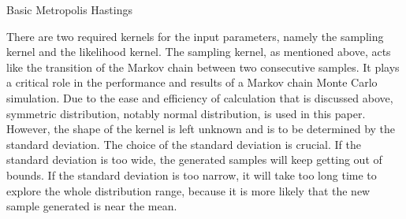 \begin{algorithm}[H]
\BlankLine


\caption[Metropolis Hastings]{Basic Metropolis Hastings}
\end{algorithm}

There are two required kernels for the input parameters, namely the sampling kernel and the likelihood kernel. The sampling kernel, as mentioned above, acts like the transition of the Markov chain between two consecutive samples. It plays a critical role in the performance and results of a Markov chain Monte Carlo simulation.\cite{mcmc_practice} Due to the ease and efficiency of calculation that is discussed above, symmetric distribution, notably normal distribution, is used in this paper.\cite{gaussian_distribution_property} However, the shape of the kernel is left unknown and is to be determined by the standard deviation.\cite{normal} The choice of the standard deviation is crucial. If the standard deviation is too wide, the generated samples will keep getting out of bounds. If the standard deviation is too narrow, it will take too long time to explore the whole distribution range, because it is more likely that the new sample generated is near the mean. 

